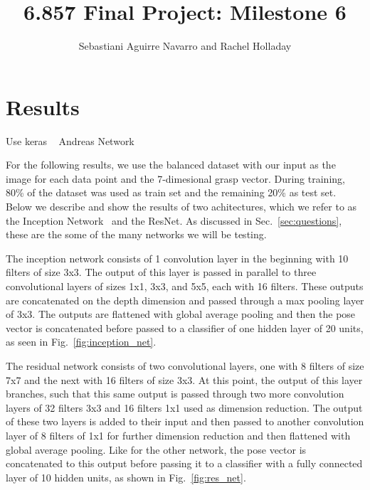 \documentclass[letterpaper, 10 pt, conference]{../ieeeconf}
\newcommand{\sref}[1]{Sec.~\ref{#1}} %
\newcommand{\figref}[1]{Fig.~\ref{#1}} %
\begin{document}
\title{6.857 Final Project: Milestone 6}
\author{Sebastiani Aguirre Navarro and Rachel Holladay}
\maketitle






\section{Results}
\label{sec:results}
Use keras ~\cite{chollet2017keras}
Andreas Network ~\cite{viereck2017learning}

For the following results, we use the balanced dataset with our input as the image for each data point and the 7-dimesional grasp vector. 
During training, 80\% of the dataset was used as train set and the remaining 20\% as test set. 
Below we describe and show the results of two achitectures, which we refer to as the Inception Network~\cite{szegedy2015going} and the ResNet.
As discussed in \sref{sec:questions}, these are the some of the many networks we will be testing.  

The inception network consists of 1 convolution layer in the beginning with 10 filters of size 3x3. 
The output of this layer is passed in parallel to three convolutional layers of sizes 1x1, 3x3, and 5x5, each with 16 filters. 
These outputs are concatenated on the depth dimension and passed through a max pooling layer of 3x3. 
The outputs are flattened with global average pooling and then the pose vector is concatenated before passed to a classifier of one hidden layer of 20 units, as seen in \figref{fig:inception_net}. 

The residual network consists of two convolutional layers, one with 8 filters of size 7x7 and the next with 16 filters of size 3x3.
At this point, the output of this layer branches, such that this same output is passed through two more convolution layers of 32 filters 3x3 and 16 filters 1x1 used as dimension reduction. 
The output of these two layers is added to their input and then passed to another convolution layer of 8 filters of 1x1 for further dimension reduction and then flattened with global average pooling. 
Like for the other network, the pose vector is concatenated to this output before passing it to a classifier with a fully connected layer of 10 hidden units, as shown in \figref{fig:res_net}.
 
\end{document}
